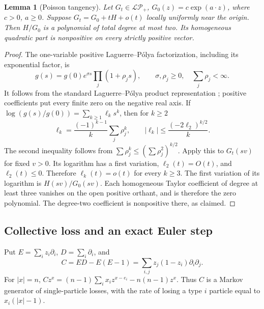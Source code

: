 \documentclass[reqno]{amsart}
\newtheorem{lemma}[theorem]{Lemma}
\theoremstyle{definition}
\theoremstyle{remark}
\begin{document}
\begin{lemma}[Poisson tangency]\label{pos:poisson}
Let \(G_t\in\mathcal{LP}_+\), \(G_0(z)=c\exp(a\cdot z)\), where \(c>0\), \(a\ge0\).
Suppose \(G_t=G_0+tH+o(t)\) locally uniformly near the origin.  Then
\(H/G_0\) is a polynomial of total degree at most two.  Its homogeneous quadratic
part is nonpositive on every strictly positive vector.
\end{lemma}
\begin{proof}
The one-variable positive Laguerre--P\'olya factorization, including its exponential
factor, is
\[
 g(s)=g(0)e^{\sigma s}\prod_j(1+\rho_js),
 \qquad \sigma,\rho_j\ge0,\quad \sum_j\rho_j<\infty.
\]
It follows from the standard Laguerre--P\'olya product representation
\cite{LVR10}; positive coefficients put every finite zero on the negative real axis.
If \(\log(g(s)/g(0))=\sum_{k\ge1}\ell_ks^k\), then for \(k\ge2\)
\[
 \ell_k=\frac{(-1)^{k-1}}k\sum_j\rho_j^k,
 \qquad
 |\ell_k|\le\frac{(-2\ell_2)^{k/2}}k.
\]
The second inequality follows from
\(\sum\rho_j^k\le(\sum\rho_j^2)^{k/2}\).
Apply this to \(G_t(sv)\) for fixed \(v>0\).  Its logarithm has a first variation,
\(\ell_2(t)=O(t)\), and \(\ell_2(t)\le0\).  Therefore
\(\ell_k(t)=o(t)\) for every \(k\ge3\).
The first variation of its logarithm is \(H(sv)/G_0(sv)\).
Each homogeneous Taylor coefficient of degree at least three vanishes on the open
positive orthant, and is therefore the zero polynomial.  The degree-two coefficient
is nonpositive there, as claimed.
\end{proof}

\subsection{Collective loss and an exact Euler step}

Put \(E=\sum_i z_i\partial_i\), \(D=\sum_i\partial_i\), and
\begin{equation}\label{pos:coal-operator}
 C=ED-E(E-1)=\sum_{i,j}z_j(1-z_i)\partial_i\partial_j.
\end{equation}
For \(|x|=n\),
\(Cz^x=(n-1)\sum_i x_i z^{x-e_i}-n(n-1)z^x\).
Thus \(C\) is a Markov generator of single-particle losses, with the rate of losing
a type \(i\) particle equal to \(x_i(|x|-1)\).
\end{document}
